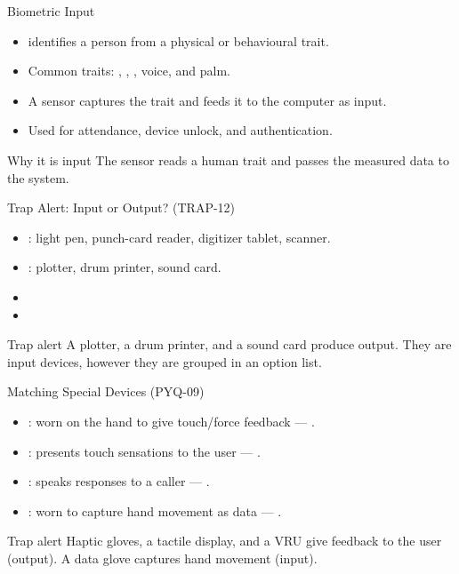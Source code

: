 \documentclass[aspectratio=169]{beamer}
\begin{document}
\begin{frame}{Biometric Input}
  \begin{itemize}
    \item {} identifies a person from a physical or
      behavioural trait.
    \item Common traits: , , , voice,
      and palm.
    \item A sensor captures the trait and feeds it to the computer as
      input.
    \item Used for attendance, device unlock, and authentication.
  \end{itemize}
  \begin{block}{Why it is input}
    The sensor reads a human trait and passes the measured data to the
    system.
  \end{block}
\end{frame}

\begin{frame}{Trap Alert: Input or Output? (TRAP-12)}
  \begin{itemize}
    \item {}: light pen, punch-card reader, digitizer tablet,
      scanner.
    \item {}: plotter, drum printer, sound card.
    \item {}
    \item {}
  \end{itemize}
  \begin{alertblock}{Trap alert}
    A plotter, a drum printer, and a sound card produce output. They are
     input devices, however they are grouped in an option list.
  \end{alertblock}
\end{frame}

\begin{frame}{Matching Special Devices (PYQ-09)}
  \begin{itemize}
    \item {}: worn on the hand to give touch/force
      feedback --- .
    \item {}: presents touch sensations to the user ---
      .
    \item {}: speaks responses to a caller ---
      .
    \item {}: worn to capture hand movement as data ---
      .
  \end{itemize}
  \begin{alertblock}{Trap alert}
    Haptic gloves, a tactile display, and a VRU give feedback to the user
    (output). A data glove captures hand movement (input).
  \end{alertblock}
\end{frame}
\end{document}
